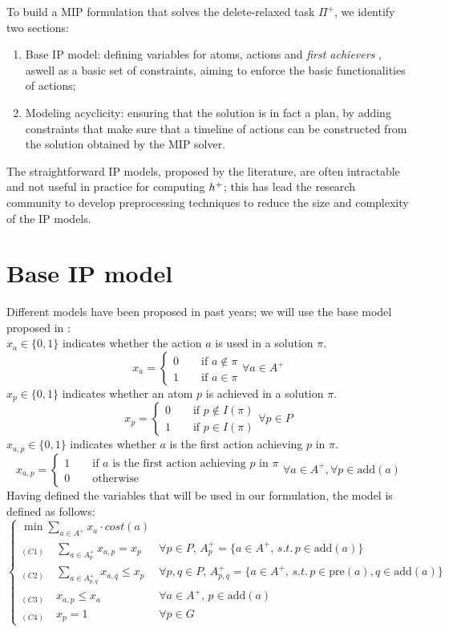 To build a MIP formulation that solves the delete-relaxed task $\Pi^+$, we identify two sections:
\begin{enumerate}
    \item Base IP model: defining variables for atoms, actions and \textit{first achievers} \cite{Imai_15}, aswell as a basic set of constraints, aiming to enforce the basic functionalities of actions;
    \item Modeling acyclicity: ensuring that the solution is in fact a plan, by adding constraints that make sure that a timeline of actions can be constructed from the solution obtained by the MIP solver.
\end{enumerate}
The straightforward IP models, proposed by the literature, are often intractable and not useful in practice for computing $h^+$; this has lead the research community to develop preprocessing techniques to reduce the size and complexity of the IP models.

\section{Base IP model}
Different models have been proposed in past years; we will use the base model proposed in \cite{Rankooh_22}:\\
$x_a\in\{0,1\}$ indicates whether the action $a$ is used in a solution $\pi$.
$$x_a=
\begin{cases}
    0\qquad\mbox{if }a\not\in\pi\\
    1\qquad\mbox{if }a\in\pi
\end{cases}\forall a\in A^+
$$
$x_p\in\{0,1\}$ indicates whether an atom $p$ is achieved in a solution $\pi$.
$$x_p=
\begin{cases}
    0\qquad\mbox{if }p\not\in I(\pi)\\
    1\qquad\mbox{if }p\in I(\pi)
\end{cases}\forall p\in P
$$
$x_{a,p}\in\{0,1\}$ indicates whether $a$ is the first action achieving $p$ in $\pi$.
$$x_{a,p}=
\begin{cases}
    1\qquad\mbox{if }a\mbox{ is the first action achieving }p\mbox{ in }\pi\\
    0\qquad\mbox{otherwise}
\end{cases}\forall a\in A^+,\forall p\in \mbox{add}(a)
$$
Having defined the variables that will be used in our formulation, the model is defined as follows:
$$
\begin{cases}
    \displaystyle\min\sum_{ a\in A^+}x_a\cdot cost(a)\\
    \displaystyle_{(C1)}\quad\sum_{a\in A^+_p}x_{a,p}=x_p&\forall p\in P,\,A^+_p=\{a\in A^+,\,s.t.\,p\in \mbox{add}(a)\}\\
    \displaystyle_{(C2)}\quad\sum_{a\in A^+_{p,q}}x_{a,q}\leq x_p&\forall p,q\in P,\,A^+_{p,q}=\{a\in A^+,\,s.t.\,p\in \mbox{pre}(a),q\in \mbox{add}(a)\}\\
    _{(C3)}\quad x_{a,p}\leq x_a&\forall a\in A^+,\,p\in \mbox{add}(a)\\
    _{(C4)}\quad x_p=1&\forall p\in G
\end{cases}
$$

